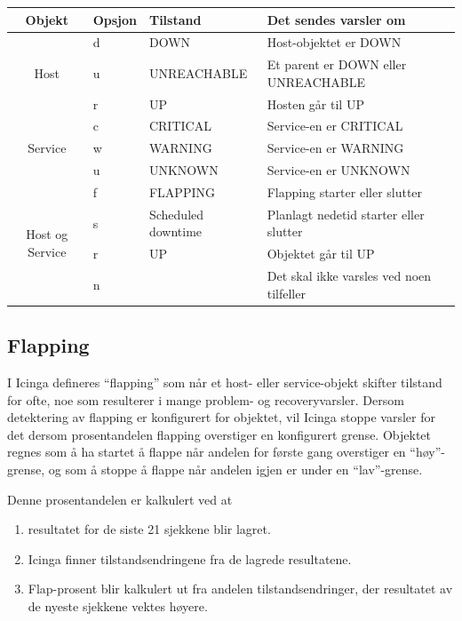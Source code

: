 \begin{table}
\begin{center}
\begin{tabular}{| c | l | l | p{7cm} |} \hline
        \textbf{Objekt} & \textbf{Opsjon} & \textbf{Tilstand} & \textbf{Det sendes varsler om} \\ \hline
	\multirow{3}{*}{Host} & d & DOWN 			& Host-objektet er DOWN 			\\ \cline{2-4}
					    & u & UNREACHABLE 		& Et parent er DOWN eller UNREACHABLE		\\ \cline{2-4}	
					    & r & UP 			& Hosten går til UP				\\ \hline 
        \multirow{3}{*}{Service} 	    & c & CRITICAL 		& Service-en er CRITICAL 			\\ \cline{2-4}
					    & w & WARNING  		& Service-en er WARNING  			\\ \cline{2-4}
					    & u & UNKNOWN  		& Service-en er UNKNOWN  			\\ \hline
	\multirow{4}{*}{Host og Service} & f & FLAPPING           	& Flapping starter eller slutter 		\\ \cline{2-4}
					    & s & Scheduled downtime 	& Planlagt nedetid starter eller slutter 	\\ \cline{2-4}
				 	    & r & UP                 	& Objektet går til UP 				\\ \cline{2-4}  
					    & n &                    	& Det skal ikke varsles ved noen tilfeller 	\\ \cline{2-4}
	\hline
\end{tabular}
\label{objekt_varsling}
\end{center}
\end{table}

\subsection{Flapping}
I Icinga defineres ``flapping'' som når et host- eller service-objekt skifter tilstand for ofte, noe som resulterer i mange problem- og recoveryvarsler. \cite{icingaflapping} Dersom detektering av flapping er konfigurert for objektet, vil Icinga stoppe varsler for det dersom prosentandelen flapping overstiger en konfigurert grense. Objektet regnes som å ha startet å flappe når andelen for første gang overstiger en ``høy''-grense, og som å stoppe å flappe når andelen igjen er under en ``lav''-grense.

Denne prosentandelen er kalkulert ved at
\begin{enumerate}
	\item resultatet for de siste 21 sjekkene blir lagret.
	\item Icinga finner tilstandsendringene fra de lagrede resultatene.
	\item Flap-prosent blir kalkulert ut fra andelen tilstandsendringer, der resultatet av de nyeste sjekkene vektes høyere.
\end{enumerate}

